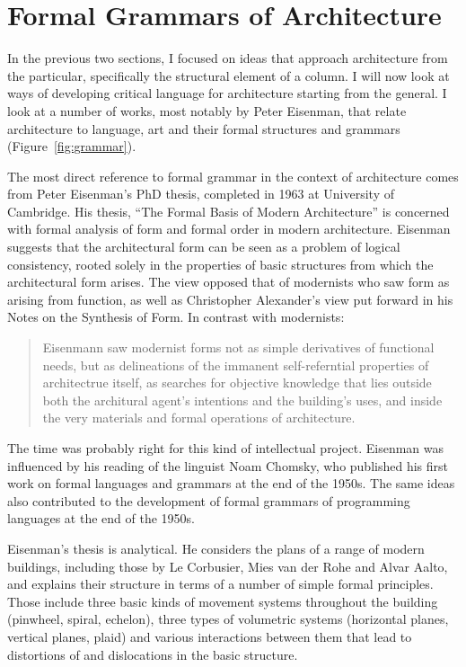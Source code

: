 \section{Formal Grammars of Architecture}

In the previous two sections, I focused on ideas that approach architecture from
the particular, specifically the structural element of a column. I will now look at ways
of developing critical language for architecture starting from the general.
I look at a number of works, most notably by Peter Eisenman, that relate architecture to
language, art and their formal structures and grammars (Figure~\ref{fig:grammar}).

The most direct reference to formal grammar in the context of architecture comes
from Peter Eisenman's PhD thesis, completed in 1963 at University of Cambridge. His thesis,
``The Formal Basis of Modern Architecture'' is concerned with formal analysis of
form and formal order in modern architecture. Eisenman suggests that the architectural form
can be seen as a problem of logical consistency, rooted solely in the properties of basic
structures from which the architectural form arises. The view opposed that of modernists who saw
form as arising from function, as well as Christopher Alexander's view put forward in his
Notes on the Synthesis of Form. In contrast with modernists:

\begin{quote}
Eisenmann saw modernist forms not as simple derivatives of functional needs, but as
delineations of the immanent self-referntial properties of architectrue itself,
as searches for objective knowledge that lies outside both the architural agent's intentions
and the building's uses, and inside the very materials and formal operations of
architecture.
\end{quote}

The time was probably right for this kind of intellectual project.
Eisenman was influenced by his reading of the linguist Noam Chomsky,
who published his first work on formal languages and grammars at the end of the 1950s. The
same ideas also contributed to the development of formal grammars of programming languages at
the end of the 1950s.

Eisenman's thesis is analytical. He considers the plans of a range of modern buildings,
including those by Le Corbusier, Mies van der Rohe and Alvar Aalto, and explains their
structure in terms of a number of simple formal principles. Those include three basic
kinds of movement systems throughout the building (pinwheel, spiral, echelon), three types
of volumetric systems (horizontal planes, vertical planes, plaid) and various interactions
between them that lead to distortions of and dislocations in the basic structure.

